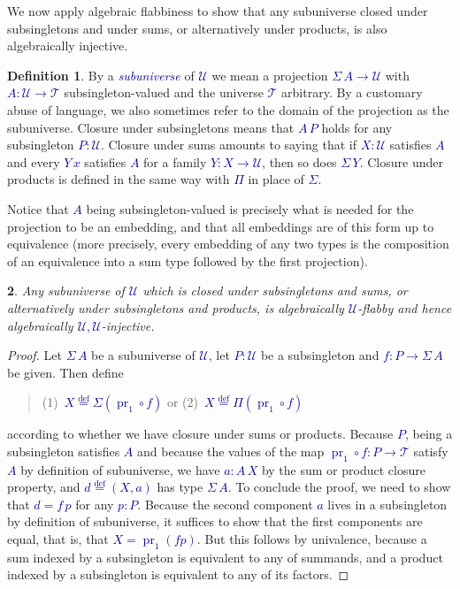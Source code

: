 \documentclass[10pt]{article}
\newcommand{\db}{\textcolor{darkblue}}
\newcommand{\df}[1]{\emph{\db{#1}}}
\newcommand{\m}[1]{\db{$#1$}}
\newcommand{\fst}{\operatorname{pr}_1}
\newcommand{\comp}{\mathrel{\circ}}
\newcommand{\U}{\mathcal{U}}
\newcommand{\T}{\mathcal{T}}
\newcommand{\eqdef}{\overset{\text{def}}{=}}
\newtheorem{numbered}{}
\theoremstyle{definition}
\newtheorem{definition}[numbered]{Definition}
\begin{document}
We now apply algebraic flabbiness to show that any subuniverse closed
under subsingletons and under sums, or alternatively under products,
is also algebraically injective.
\begin{definition}
  By a \df{subuniverse} of \m{\U} we mean a projection \m{\Sigma \, A
    \to \U} with \m{A : \U \to \T} subsingleton-valued and the
  universe \m{\T} arbitrary. By a customary abuse of language, we also
  sometimes refer to the domain of the projection as the
  subuniverse. Closure under subsingletons means that \m{A\,P} holds
  for any subsingleton \m{P:\U}. Closure under sums amounts to
  saying that if \m{X:\U} satisfies \m{A} and every \m{Y \, x}
  satisfies \m{A} for a family \m{Y : X \to \U}, then so does
  \m{\Sigma \, Y}. Closure under products is defined in the same way
  with \m{\Pi} in place of \m{\Sigma}.
\end{definition}
\noindent Notice that \m{A} being subsingleton-valued is
precisely what is needed for the projection to be an embedding, and
that all embeddings are of this form up to equivalence (more
precisely, every embedding of any two types is the composition of an
equivalence into a sum type followed by the first projection).

\begin{numbered}
  Any subuniverse of \m{\U} which is closed
  under subsingletons and sums, or alternatively under subsingletons and
  products, is algebraically \m{\U}-flabby and hence
  algebraically \m{\U,\U}-injective.
\end{numbered}
\begin{proof}
  Let \m{\Sigma\,A} be a subuniverse of \m{\U}, let \m{P:\U} be a
  subsingleton and \m{f : P \to \Sigma \, A} be given. Then define
  \begin{quote}
  (1)~\m{ X \eqdef \Sigma (\fst \comp f)} \qquad or \qquad (2)~\m{X \eqdef \Pi (\fst \comp f)}
  \end{quote}
  according to whether we have closure under sums or products. Because
  \m{P}, being a subsingleton satisfies \m{A} and because the values
  of the map \m{\fst \comp f : P \to \T} satisfy \m{A} by definition
  of subuniverse, we have \m{a : A\, X} by the sum or product closure
  property, and \m{d \eqdef (X,a)} has type \m{\Sigma \,A}. To
  conclude the proof, we need to show that \m{d = f\,p} for any
  \m{p:P}. Because the second component \m{a} lives in a subsingleton
  by definition of subuniverse, it suffices to show that the first
  components are equal, that is, that \m{X = \fst (f p)}. But this
  follows by univalence, because a sum indexed by a subsingleton is
  equivalent to any of summands, and a product indexed by a
  subsingleton is equivalent to any of its factors.
\end{proof}
\end{document}
